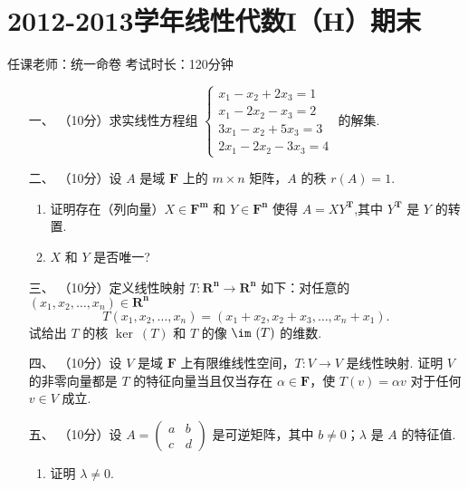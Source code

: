 \section*{2012-2013学年线性代数I（H）期末}

\begin{center}
    任课老师：统一命卷\hspace{4em} 考试时长：120分钟
\end{center}

\begin{enumerate}
    \item [一、]（10分）求实线性方程组 $\begin{cases}x_1-x_2+2x_3 = 1 \\ x_1-2x_2-x_3=2 \\ 3x_1-x_2+5x_3=3 \\ 2x_1-2x_2-3x_3 = 4\end{cases}$ 的解集.

    \item [二、]（10分）设 $A$ 是域 $\mathbf{F}$ 上的 $m\times n$ 矩阵，$A$ 的秩 $r(A)=1$.
    \begin{enumerate}[label=(\arabic*)]
        \item 证明存在（列向量）$X\in \mathbf{F^m}$ 和 $Y\in \mathbf{F^n}$ 使得 $A=XY^\mathbf{T}$,其中 $Y^\mathbf{T}$ 是 $Y$ 的转置.

        \item $X$ 和 $Y$ 是否唯一?
    \end{enumerate}

\item [三、]（10分）定义线性映射 $T:\mathbf{R^n} \to \mathbf{R^n}$ 如下：对任意的 $(x_1,x_2,\ldots,x_n) \in \mathbf{R^n}$
    \[T(x_1,x_2,\ldots,x_n)=(x_1+x_2,x_2+x_3,\ldots,x_n+x_1).\]
    试给出 $T$ 的核 $\ker \ (T)$ 和 $T$ 的像 $\im \ (T)$ 的维数.

\item [四、]（10分）设 $V$ 是域 $\mathbf{F}$ 上有限维线性空间，$T:V\to V$ 是线性映射. 证明 $V$ 的非零向量都是 $T$ 的特征向量当且仅当存在 $\alpha \in \mathbf{F}$，使 $T(v)=\alpha v$ 对于任何 $v \in V$ 成立.

\item [五、]（10分）设 $A=\begin{pmatrix}a & b \\ c & d\end{pmatrix}$ 是可逆矩阵，其中 $b\neq 0$；$\lambda$ 是 $A$ 的特征值.
\begin{enumerate}[label=(\arabic*)]
    \item 证明 $\lambda \neq 0$.


\end{enumerate}
\end{enumerate}
